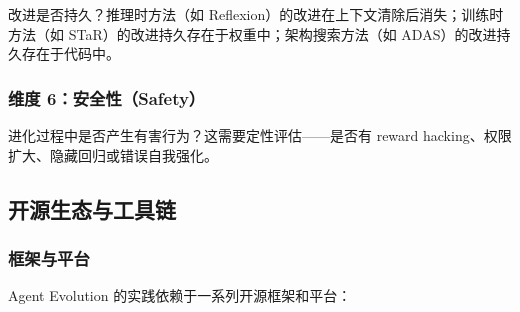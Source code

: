改进是否持久？推理时方法（如 Reflexion）的改进在上下文清除后消失；训练时方法（如 STaR）的改进持久存在于权重中；架构搜索方法（如 ADAS）的改进持久存在于代码中。

\subsubsection{维度 6：安全性（Safety）}

进化过程中是否产生有害行为？这需要定性评估——是否有 reward hacking、权限扩大、隐藏回归或错误自我强化。

\begin{table}[htbp]
\centering
\caption{方法在六个评估维度上的表现。}
\label{tab:eval-dims}
\end{table}

\subsection{开源生态与工具链}\label{sec:intro-ecosystem}

\subsubsection{框架与平台}

Agent Evolution 的实践依赖于一系列开源框架和平台：

